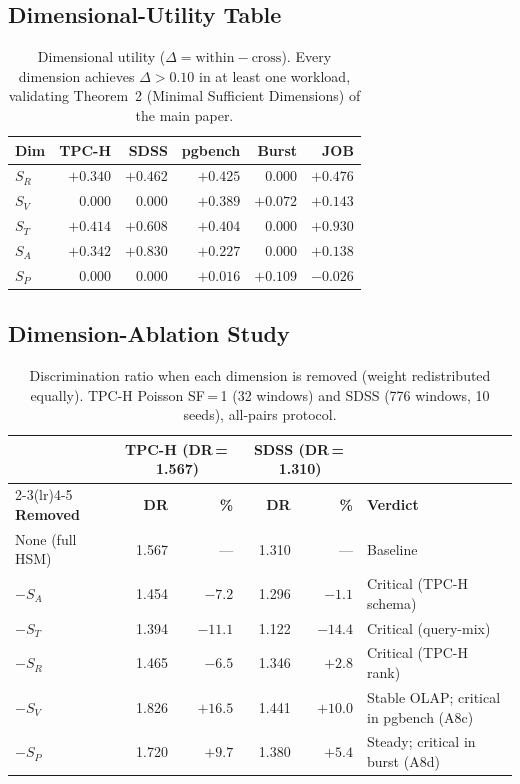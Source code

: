 \documentclass[10pt,twocolumn,a4paper]{article}
\newcommand{\SR}{S_{R}}
\newcommand{\SV}{S_{V}}
\newcommand{\ST}{S_{T}}
\newcommand{\SA}{S_{A}}
\newcommand{\SPER}{S_{P}}
\begin{document}
\subsection{Dimensional-Utility Table}\label{supp:dim-utility}

\begin{table}[!htb]\centering\scriptsize
\caption{Dimensional utility ($\Delta\!=\!\text{within}-\text{cross}$).
Every dimension achieves $\Delta\!>\!0.10$ in at least one workload,
validating Theorem~2 (Minimal Sufficient Dimensions) of the main paper.}\label{tab:dim-utility-supp}
\begin{tabular}{@{}lrrrrr@{}}
\toprule
\textbf{Dim} & \textbf{TPC-H} & \textbf{SDSS} & \textbf{pgbench} & \textbf{Burst} & \textbf{JOB}\\
\midrule
$\SR$   & $+0.340$ & $+0.462$ & $+0.425$ & $0.000$  & $+0.476$\\
$\SV$   & $0.000$  & $0.000$  & $+0.389$ & $+0.072$ & $+0.143$\\
$\ST$   & $+0.414$ & $+0.608$ & $+0.404$ & $0.000$  & $+0.930$\\
$\SA$   & $+0.342$ & $+0.830$ & $+0.227$ & $0.000$  & $+0.138$\\
$\SPER$ & $0.000$  & $0.000$  & $+0.016$ & $+0.109$ & $-0.026$\\
\bottomrule
\end{tabular}
\end{table}

\subsection{Dimension-Ablation Study}\label{supp:ablation}

\begin{table}[!t]\centering\small
\caption{Discrimination ratio when each dimension is removed (weight
redistributed equally). TPC-H Poisson SF\,=\,1 (32 windows) and SDSS
(776 windows, 10 seeds), all-pairs protocol.}\label{tab:ablation-supp}
\setlength{\tabcolsep}{6pt}
\begin{tabular}{@{}lrrrrl@{}}
\toprule
 & \multicolumn{2}{c}{\textbf{TPC-H} (DR\,=\,1.567)} & \multicolumn{2}{c}{\textbf{SDSS} (DR\,=\,1.310)} & \\
\cmidrule(lr){2-3}\cmidrule(lr){4-5}
\textbf{Removed} & \textbf{DR} & \textbf{\%} & \textbf{DR} & \textbf{\%} & \textbf{Verdict}\\
\midrule
None (full HSM) & 1.567 & --- & 1.310 & --- & Baseline\\
$-\SA$  & 1.454 & $-7.2$  & 1.296 & $-1.1$  & Critical (TPC-H schema)\\
$-\ST$  & 1.394 & $-11.1$ & 1.122 & $-14.4$ & Critical (query-mix)\\
$-\SR$  & 1.465 & $-6.5$  & 1.346 & $+2.8$  & Critical (TPC-H rank)\\
$-\SV$  & 1.826 & $+16.5$ & 1.441 & $+10.0$ & Stable OLAP; critical in pgbench (A8c)\\
$-\SPER$& 1.720 & $+9.7$  & 1.380 & $+5.4$  & Steady; critical in burst (A8d)\\
\bottomrule
\end{tabular}
\end{table}
\end{document}
